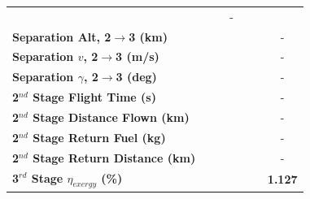 \begin{table}[ht]
\begin{tabular}{l c c c c c c}
		& \textbf{\secondExergyEffISPThreeOneHundredFive}
		& \textbf{\secondExergyEffISPThreeOneHundredTen}
		& -
		\\
		\textbf{Separation Alt, 2$\rightarrow$3 (km)}
		& \secondthirdSeparationAltISPThreeNinety
		& \secondthirdSeparationAltISPThreeNinetyFive
		& \secondthirdSeparationAltISPThreeStandard
		& \secondthirdSeparationAltISPThreeOneHundredFive
		& \secondthirdSeparationAltISPThreeOneHundredTen
		& -
		\\
		\textbf{Separation $v$, 2$\rightarrow$3 (m/s)}
		& \secondthirdSeparationvISPThreeNinety
		& \secondthirdSeparationvISPThreeNinetyFive
		& \secondthirdSeparationvISPThreeStandard
		& \secondthirdSeparationvISPThreeOneHundredFive
		& \secondthirdSeparationvISPThreeOneHundredTen
		& -
		\\
		\textbf{Separation $\gamma$, 2$\rightarrow$3 (deg)}
		& \secondthirdSeparationgammaISPThreeNinety
		& \secondthirdSeparationgammaISPThreeNinetyFive
		& \secondthirdSeparationgammaISPThreeStandard
		& \secondthirdSeparationgammaISPThreeOneHundredFive
		& \secondthirdSeparationgammaISPThreeOneHundredTen
		& -
		\\
		\textbf{2$^{nd}$ Stage Flight Time (s)}
		& \secondFlightTimeISPThreeNinety
		& \secondFlightTimeISPThreeNinetyFive
		& \secondFlightTimeISPThreeStandard
		& \secondFlightTimeISPThreeOneHundredFive
		& \secondFlightTimeISPThreeOneHundredTen
		& -
		\\
		\textbf{2$^{nd}$ Stage Distance Flown (km)}
		& \SecondDistISPThreeNinety
		& \SecondDistISPThreeNinetyFive
		& \SecondDistISPThreeStandard
		& \SecondDistISPThreeOneHundredFive
		& \SecondDistISPThreeOneHundredTen
		& -
		\\
		\textbf{2$^{nd}$ Stage Return Fuel (kg)}
		& \returnFuelISPThreeNinety
		& \returnFuelISPThreeNinetyFive
		& \returnFuelISPThreeStandard
		& \returnFuelISPThreeOneHundredFive
		& \returnFuelISPThreeOneHundredTen
		& -
		\\
		\textbf{2$^{nd}$ Stage Return Distance (km)}
		& \returnDistISPThreeNinety
		& \returnDistISPThreeNinetyFive
		& \returnDistISPThreeStandard
		& \returnDistISPThreeOneHundredFive
		& \returnDistISPThreeOneHundredTen
		& -
		\\
		\hline 
		\textbf{3$^{rd}$ Stage $\eta_{exergy}$ (\%)}
		& \textbf{\thirddExergyEffISPThreeNinety}
		& \textbf{\thirddExergyEffISPThreeNinetyFive}
		& \textbf{\thirddExergyEffISPThreeStandard}
		& \textbf{\thirddExergyEffISPThreeOneHundredFive}
		& \textbf{\thirddExergyEffISPThreeOneHundredTen}
		& \textbf{1.127}
		\\

\end{tabular}
\end{table}
